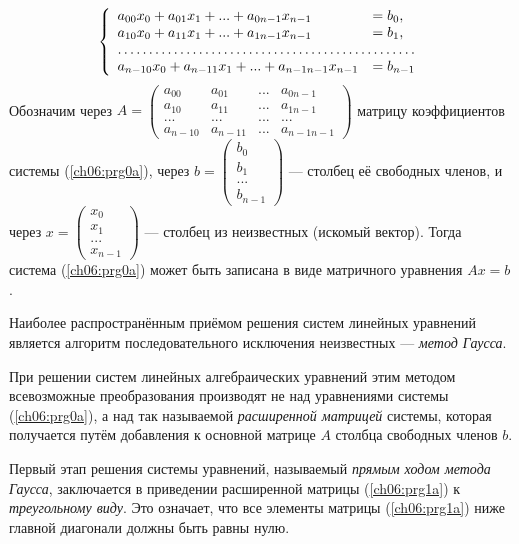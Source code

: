 \begin{equation}\label{ch06:prg0a}
\left\{\begin{array}{ll}
a_{00}x_0+a_{01}x_1+...+a_{0n-1}x_{n-1}&=b_0,\\
a_{10}x_0+a_{11}x_1+...+a_{1n-1}x_{n-1}&=b_1,\\
\hdotsfor{2}\\
a_{n-10}x_0+a_{n-11}x_1+...+a_{n-1n-1}x_{n-1}&=b_{n-1}
\end{array}\right.
\end{equation}
Обозначим через 
$A=\left(\begin{matrix}
a_{00}&a_{01}&...&a_{0n-1}\\
a_{10}&a_{11}&...&a_{1n-1}\\
...&...&...&...\\
a_{n-10}&a_{n-11}&...&a_{n-1n-1}
\end{matrix}\right)$
матрицу коэффициентов системы (\ref{ch06:prg0a}), через 
$b=\left(\begin{matrix}b_0\\b_1\\...\\b_{n-1}\end{matrix}\right)$ --- столбец её свободных членов, и через
$x=\left(\begin{matrix}x_0\\x_1\\...\\x_{n-1}\end{matrix}\right)$ --- столбец из неизвестных (искомый вектор). Тогда
система (\ref{ch06:prg0a})  может быть записана в виде матричного уравнения  $Ax=b$.

Наиболее распространённым приёмом решения систем линейных уравнений является алгоритм последовательного исключения неизвестных --- \emph{метод Гаусса}.

При решении систем линейных алгебраических уравнений этим методом всевозможные преобразования производят не над
уравнениями системы (\ref{ch06:prg0a}), а над так называемой \emph{расширенной матрицей} системы, которая получается
путём добавления к основной матрице $A$ столбца свободных членов $b$.

Первый этап решения системы уравнений, называемый \emph{прямым ходом метода Гаусса}, заключается в приведении
расширенной матрицы (\ref{ch06:prg1a}) к \emph{треугольному виду}. Это означает, что все элементы матрицы
(\ref{ch06:prg1a}) ниже главной диагонали должны быть равны нулю.

